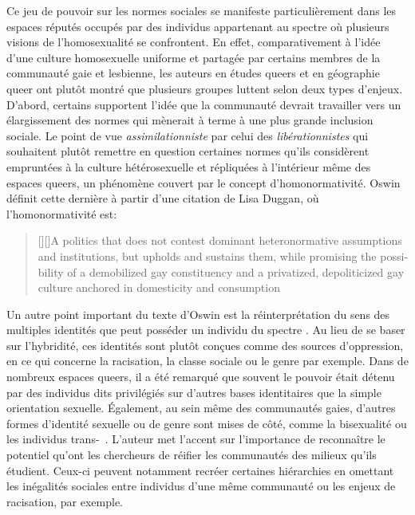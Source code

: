 Ce jeu de pouvoir sur les normes sociales se manifeste particulièrement dans les espaces réputés occupés par des individus appartenant au spectre \lgbt{} où plusieurs visions de l'homosexualité se confrontent. 
En effet, comparativement à l'idée d'une culture homosexuelle uniforme et partagée par certains membres de la communauté gaie et lesbienne, les auteurs en études queers et en géographie queer ont plutôt montré que plusieurs groupes luttent selon deux types d'enjeux.
D'abord, certains supportent l'idée que la communauté devrait travailler vers un élargissement des normes qui mènerait à terme à une plus grande inclusion sociale.
 Le point de vue \emph{assimilationniste} par celui des \emph{libérationnistes} qui souhaitent plutôt remettre en question certaines normes qu'ils considèrent empruntées à la culture hétérosexuelle et répliquées à l'intérieur même des espaces queers, un phénomène couvert par le concept d'homonormativité. 
Oswin définit cette dernière à partir d'une citation de Lisa Duggan, où l'homonormativité est: 
\foreignblockquote{english}[{\cite[tel que cité dans][92]{Oswin2008}}][]{[{\cite[50]{Duggan2003}}][]{A politics that does not contest dominant heteronormative assumptions and institutions, but upholds and sustains them, while promising the possibility of a demobilized gay constituency and a privatized, depoliticized gay culture anchored in domesticity and consumption}}.

Un autre point important du texte d'Oswin est la réinterprétation du sens des multiples identités que peut posséder un individu du spectre \lgbt{}. 
Au lieu de se baser sur l'hybridité, ces identités sont plutôt conçues comme des sources d'oppression, en ce qui concerne la racisation, la classe sociale ou le genre par exemple. 
Dans de nombreux espaces queers, il a été remarqué que souvent le pouvoir était détenu par des individus dits privilégiés sur d'autres bases identitaires que la simple orientation sexuelle. 
Également, au sein même des communautés gaies, d'autres formes d'identité sexuelle ou de genre sont mises de côté, comme la bisexualité ou les individus trans-~\citep[93]{Oswin2008}.
L'auteur met l'accent sur l'importance de reconnaître le potentiel qu'ont les chercheurs de réifier les communautés des milieux qu'ils étudient. Ceux-ci peuvent notamment recréer certaines hiérarchies en omettant les inégalités sociales entre individus d'une même communauté ou les enjeux de racisation, par exemple.


